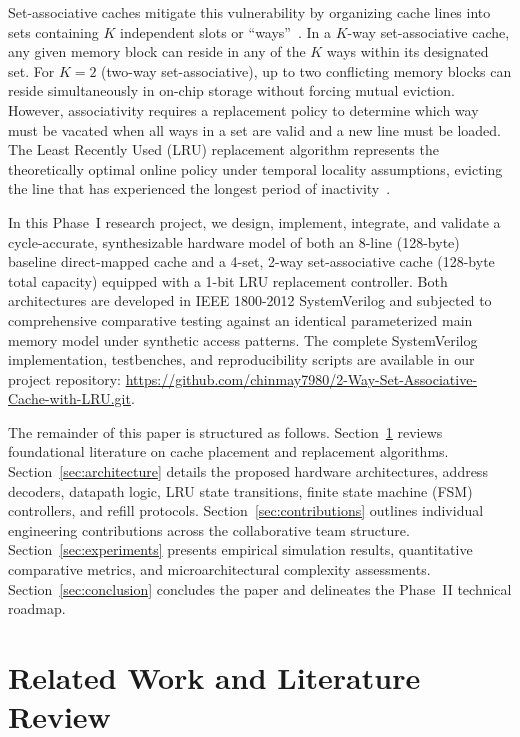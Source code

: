 \documentclass[conference]{IEEEtran}
\begin{document}
Set-associative caches mitigate this vulnerability by organizing cache lines into sets containing $K$ independent slots or ``ways''~\cite{smith1982cache}. In a $K$-way set-associative cache, any given memory block can reside in any of the $K$ ways within its designated set. For $K=2$ (two-way set-associative), up to two conflicting memory blocks can reside simultaneously in on-chip storage without forcing mutual eviction. However, associativity requires a replacement policy to determine which way must be vacated when all ways in a set are valid and a new line must be loaded. The Least Recently Used (LRU) replacement algorithm represents the theoretically optimal online policy under temporal locality assumptions, evicting the line that has experienced the longest period of inactivity~\cite{smith1983instruction}.

In this Phase~I research project, we design, implement, integrate, and validate a cycle-accurate, synthesizable hardware model of both an 8-line (128-byte) baseline direct-mapped cache and a 4-set, 2-way set-associative cache (128-byte total capacity) equipped with a 1-bit LRU replacement controller. Both architectures are developed in IEEE 1800-2012 SystemVerilog and subjected to comprehensive comparative testing against an identical parameterized main memory model under synthetic access patterns. The complete SystemVerilog implementation, testbenches, and reproducibility scripts are available in our project repository: \url{https://github.com/chinmay7980/2-Way-Set-Associative-Cache-with-LRU.git}.

The remainder of this paper is structured as follows. Section~\ref{sec:related_work} reviews foundational literature on cache placement and replacement algorithms. Section~\ref{sec:architecture} details the proposed hardware architectures, address decoders, datapath logic, LRU state transitions, finite state machine (FSM) controllers, and refill protocols. Section~\ref{sec:contributions} outlines individual engineering contributions across the collaborative team structure. Section~\ref{sec:experiments} presents empirical simulation results, quantitative comparative metrics, and microarchitectural complexity assessments. Section~\ref{sec:conclusion} concludes the paper and delineates the Phase~II technical roadmap.

\section{Related Work and Literature Review}
\label{sec:related_work}
\end{document}
